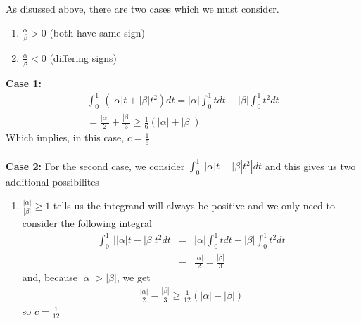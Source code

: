 \documentclass[11pt]{SelfArxOneColBMN}
\begin{document}
\begin{solution}
  \noindent As disussed above, there are two cases which we must consider.
  \begin{enumerate}
    \item $\frac{\alpha}{\beta} > 0$ (both have same sign)
    \item $\frac{\alpha}{\beta} < 0$ (differing signs)
  \end{enumerate}
  \textbf{Case 1:}
  \begin{eqnarray*}
    \int_0^1 \: ( |\alpha| t + |\beta| t^2) dt
    = |\alpha|\int_0^1 tdt + |\beta|\int_0^1t^2dt\\
   = \frac{|\alpha|}{2} + \frac{|\beta|}{3}
    \geq \frac{1}{6}(|\alpha| + |\beta|)
  \end{eqnarray*}
  Which implies, in this case, $c = \frac{1}{6}$\\
  \\
  \textbf{Case 2: }
  For the second case, we consider $\int_0^1 ||\alpha|t - |\beta|t^2 |dt$ and this gives us two additional possibilites
  \begin{enumerate}
    \item $\frac{|\alpha|}{|\beta|} \geq 1$ tells us the integrand will always be positive and we only need to consider the following integral
    \begin{eqnarray*}
      \int_0^1 \:||\alpha|t - |\beta|t^2 dt &=& |\alpha|\int_0^1 tdt - |\beta|\int_0^1 t^2 dt\\
      &=&
      \frac{|\alpha|}{2} - \frac{|\beta|}{3}
    \end{eqnarray*}
    and, because $|\alpha| > |\beta|$, we get
    \begin{eqnarray*}
      \frac{|\alpha|}{2} - \frac{|\beta|}{3} \geq \frac{1}{12}(|\alpha| - |\beta|)
    \end{eqnarray*}
    so $c = \frac{1}{12}$
    

\end{enumerate}
\end{solution}
\end{document}

